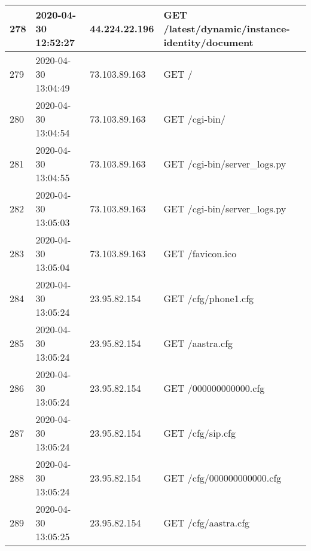 \documentclass[12pt]{article}
\begin{document}
\begin{longtable}{|l|l|l|l|}
278 & 2020-04-30 12:52:27 & 44.224.22.196   & GET /latest/dynamic/instance-identity/document                                                                                      \\ \hline
279 & 2020-04-30 13:04:49 & 73.103.89.163   & GET /                                                                                                                               \\ \hline
280 & 2020-04-30 13:04:54 & 73.103.89.163   & GET /cgi-bin/                                                                                                                       \\ \hline
281 & 2020-04-30 13:04:55 & 73.103.89.163   & GET /cgi-bin/server\_logs.py                                                                                                        \\ \hline
282 & 2020-04-30 13:05:03 & 73.103.89.163   & GET /cgi-bin/server\_logs.py                                                                                                        \\ \hline
283 & 2020-04-30 13:05:04 & 73.103.89.163   & GET /favicon.ico                                                                                                                    \\ \hline
284 & 2020-04-30 13:05:24 & 23.95.82.154    & GET /cfg/phone1.cfg                                                                                                                 \\ \hline
285 & 2020-04-30 13:05:24 & 23.95.82.154    & GET /aastra.cfg                                                                                                                     \\ \hline
286 & 2020-04-30 13:05:24 & 23.95.82.154    & GET /000000000000.cfg                                                                                                               \\ \hline
287 & 2020-04-30 13:05:24 & 23.95.82.154    & GET /cfg/sip.cfg                                                                                                                    \\ \hline
288 & 2020-04-30 13:05:24 & 23.95.82.154    & GET /cfg/000000000000.cfg                                                                                                           \\ \hline
289 & 2020-04-30 13:05:25 & 23.95.82.154    & GET /cfg/aastra.cfg                                                                                                                 \\ \hline

\end{longtable}
\end{document}
